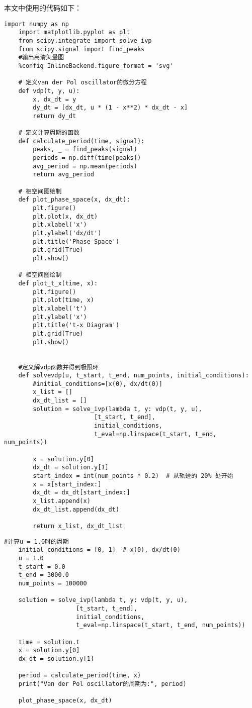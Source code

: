 \documentclass[10.5pt,oneside,a4paper]{article}
\theoremstyle{mystyle}
\begin{document}
本文中使用的代码如下：
\begin{lstlisting}[style = python]
    import numpy as np
    import matplotlib.pyplot as plt
    from scipy.integrate import solve_ivp
    from scipy.signal import find_peaks
    #输出高清矢量图
    %config InlineBackend.figure_format = 'svg'
    
    # 定义van der Pol oscillator的微分方程
    def vdp(t, y, u):
        x, dx_dt = y
        dy_dt = [dx_dt, u * (1 - x**2) * dx_dt - x]
        return dy_dt
    
    # 定义计算周期的函数
    def calculate_period(time, signal):
        peaks, _ = find_peaks(signal)
        periods = np.diff(time[peaks])
        avg_period = np.mean(periods)
        return avg_period
    
    # 相空间图绘制
    def plot_phase_space(x, dx_dt):
        plt.figure()
        plt.plot(x, dx_dt)
        plt.xlabel('x')
        plt.ylabel('dx/dt')
        plt.title('Phase Space')
        plt.grid(True)
        plt.show()
    
    # 相空间图绘制
    def plot_t_x(time, x):
        plt.figure()
        plt.plot(time, x)
        plt.xlabel('t')
        plt.ylabel('x')
        plt.title('t-x Diagram')
        plt.grid(True)
        plt.show()
    
    
    #定义解vdp函数并得到极限环
    def solvevdp(u, t_start, t_end, num_points, initial_conditions):
        #initial_conditions=[x(0), dx/dt(0)]
        x_list = []
        dx_dt_list = []
        solution = solve_ivp(lambda t, y: vdp(t, y, u),
                         [t_start, t_end],
                         initial_conditions,
                         t_eval=np.linspace(t_start, t_end, num_points))
        
        x = solution.y[0]
        dx_dt = solution.y[1]
        start_index = int(num_points * 0.2)  # 从轨迹的 20% 处开始
        x = x[start_index:]
        dx_dt = dx_dt[start_index:]
        x_list.append(x)
        dx_dt_list.append(dx_dt)
    
        return x_list, dx_dt_list
\end{lstlisting}

\begin{lstlisting}[style = python]
    #计算u = 1.0时的周期
    initial_conditions = [0, 1]  # x(0), dx/dt(0)
    u = 1.0
    t_start = 0.0
    t_end = 3000.0
    num_points = 100000

    solution = solve_ivp(lambda t, y: vdp(t, y, u),
                    [t_start, t_end],
                    initial_conditions,
                    t_eval=np.linspace(t_start, t_end, num_points))

    time = solution.t
    x = solution.y[0]
    dx_dt = solution.y[1]

    period = calculate_period(time, x)
    print("Van der Pol oscillator的周期为:", period)

    plot_phase_space(x, dx_dt)
\end{lstlisting}
\end{document}
